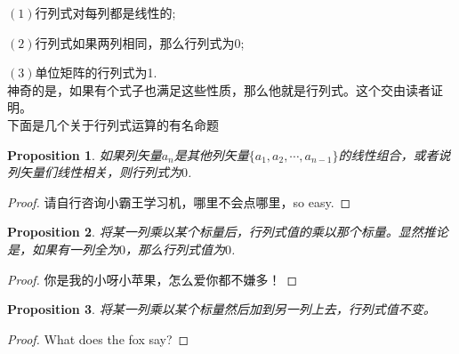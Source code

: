 \documentclass[11pt,a4paper,openany]{book}%
\theoremstyle{plain}%
\newtheorem{pro}{Proposition}[chapter]%
\newcommand{\NO}[1]{{$(#1)$}}%
\begin{document}
\NO{1}行列式对每列都是线性的;

\NO{2}行列式如果两列相同，那么行列式为0;

\NO{3}单位矩阵的行列式为1.\\
神奇的是，如果有个式子也满足这些性质，那么他就是行列式。这个交由读者证明。\\
下面是几个关于行列式运算的有名命题
\begin{pro}
\label{行列式性质1}
如果列矢量$a_n$是其他列矢量$\{a_1,a_2,\cdots,a_{n-1}\}$的线性组合，或者说列矢量们线性相关，则行列式为$0$.
\end{pro}
\begin{proof}
请自行咨询小霸王学习机，哪里不会点哪里，so easy.
\end{proof}
\begin{pro}
\label{行列式性质2}
将某一列乘以某个标量后，行列式值的乘以那个标量。显然推论是，如果有一列全为$0$，那么行列式值为$0$.
\end{pro}
\begin{proof}
你是我的小呀小苹果，怎么爱你都不嫌多！
\end{proof}
\begin{pro}
\label{行列式性质3}
将某一列乘以某个标量然后加到另一列上去，行列式值不变。
\end{pro}
\begin{proof}
What does the fox say?
\end{proof}
\end{document}
